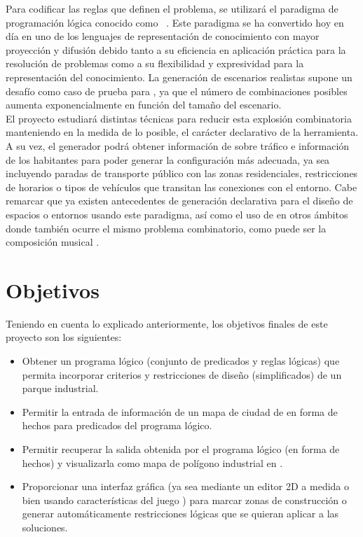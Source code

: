 Para codificar las reglas que definen el problema, se utilizará el paradigma de programación lógica conocido como \asp~\cite{asp}. Este paradigma se ha convertido hoy en día en uno de los lenguajes de representación de conocimiento con mayor proyección y difusión debido tanto a su eficiencia en aplicación práctica para la resolución de problemas como a su flexibilidad y expresividad para la representación del conocimiento. La generación de escenarios realistas \cite{5783900} supone un desafío como caso de prueba para \asp, ya que el número de combinaciones posibles aumenta exponencialmente en función del tamaño del escenario. \\

El proyecto estudiará distintas técnicas para reducir esta explosión combinatoria manteniendo en la medida de lo posible, el carácter declarativo de la herramienta. A su vez, el generador podrá obtener información de \cities sobre tráfico e información de los habitantes para poder generar la configuración más adecuada, ya sea incluyendo paradas de transporte público con las zonas residenciales, restricciones de horarios o tipos de vehículos que transitan las conexiones con el entorno. Cabe remarcar que ya existen antecedentes de generación declarativa para el diseño de espacios o entornos \cite{freeciv-editor} usando este paradigma, así como el uso de \asp en otros ámbitos donde también ocurre el mismo problema combinatorio, como puede ser la composición musical \cite{haspie} \cite{DBLP:journals/corr/abs-1006-4948}.

\section{Objetivos}

Teniendo en cuenta lo explicado anteriormente, los objetivos finales de este proyecto son los siguientes:

\begin{itemize}
	\item Obtener un programa lógico (conjunto de predicados y reglas lógicas) que permita incorporar criterios y restricciones de diseño (simplificados) de un parque industrial.
	\item Permitir la entrada de información de un mapa de ciudad de \cities en forma de hechos para predicados del programa lógico.
	\item Permitir recuperar la salida obtenida por el programa lógico (en forma de hechos) y visualizarla como mapa de polígono industrial en \cities.
	\item Proporcionar una interfaz gráfica (ya sea mediante un editor 2D a medida o bien usando características del juego \cities) para marcar zonas de construcción o generar automáticamente restricciones lógicas que se quieran aplicar a las soluciones.
\end{itemize}

